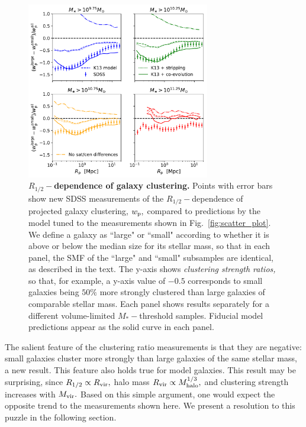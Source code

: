 \documentclass[usenatbib,usegraphicx,letterpaper]{mn2e}
\newcommand{\rhalf}{R_{1/2}}
\newcommand{\mstar}{M_{\ast}}
\newcommand{\mvir}{M_{\rm vir}}
\newcommand{\mhalo}{M_{\rm halo}}
\newcommand{\rvir}{R_{\rm vir}}
\newcommand{\wproj}{w_{\rm p}}
\begin{document}
\begin{figure}
\centering
\includegraphics[width=8cm]{FIGS/size_clustering_ratios_stripping_coevolution.pdf}
\caption{
{\bf $\rhalf-$dependence of galaxy clustering.}
Points with error bars show new SDSS measurements of the $\rhalf-$dependence of projected galaxy clustering, $\wproj,$ compared to predictions by the model tuned to the measurements shown in Fig.~\ref{fig:scatter_plot}. We define a galaxy as ``large" or ``small" according to whether it is above or below the median size for its stellar mass, so that in each panel, the SMF of the ``large" and ``small" subsamples are identical, as described in the text. The y-axis shows {\em clustering strength ratios,} so that, for example, a y-axis value of $-0.5$ corresponds to small galaxies being $50\%$ more strongly clustered than large galaxies of comparable stellar mass. Each panel shows results separately for a different volume-limited $\mstar-$threshold samples. Fiducial model predictions appear as the solid curve in each panel.
}
\label{fig:clustering_ratio_upshot}
\end{figure}

The salient feature of the clustering ratio measurements is that they are negative: small galaxies cluster more strongly than large galaxies of the same stellar mass, a new result. This feature also holds true for model galaxies. This result may be surprising, since $\rhalf\propto\rvir,$ halo mass $\rvir\propto\mhalo^{1/3},$ and clustering strength increases with $\mvir.$ Based on this simple argument, one would expect the opposite trend to the measurements shown here. We present a resolution to this puzzle in the following section. 
\end{document}
